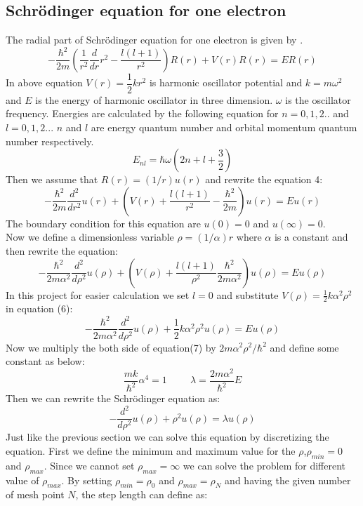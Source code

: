 \documentclass{article}
\newcommand{\hbarm}{-\frac{\hbar^{2}}{2m}}
\newcommand{\ortwo}{\frac{1}{r^{2}}}
\newcommand{\ddr}{\frac{d}{dr}}
\newcommand{\ddrsq}{\frac{d^{2}}{dr^{2}}}
\newcommand{\ddrhosq}{\frac{d^{2}}{d\rho^{2}}}
\newcommand{\onehalf}{\frac{1}{2}}
\begin{document}
\subsection{Schrödinger equation for one electron}
The radial part of Schrödinger equation for one electron is given by . 
\begin{equation}
	\hbarm	(\ortwo \ddr r^{2} - \frac{l(l+1)}{r^{2}}) R(r) + V(r)R(r) = E R(r)
\end{equation}
In above equation $V(r) = \dfrac{1}{2}kr^2$ is harmonic oscillator potential and $k = m\omega^{2}$ and $E$ is the energy of harmonic oscillator in three dimension. $\omega$ is the oscillator frequency. Energies are calculated by the following equation for $n = 0,1,2..$ and $l = 0,1,2..$. $n$ and $l$ are energy quantum number and orbital momentum quantum number respectively. 
$$E_{nl} = \hbar \omega (2n+l+\frac{3}{2})$$
Then we assume that $R(r) = (1/r)u(r)$ and rewrite the equation 4:
\begin{equation}
	\hbarm \ddrsq u(r) + (V(r) + \frac{l(l+1)}{r^{2}}\hbarm)u(r) = Eu(r)
\end{equation}
The boundary condition for this equation are $u(0) = 0$ and $u(\infty) = 0$.\\
Now we define a dimensionless variable $\rho = (1/\alpha)r$ where $\alpha$ is a constant and then rewrite the equation:
\begin{equation}
	-\frac{\hbar^{2}}{2m\alpha^{2}} \ddrhosq u(\rho) + (V(\rho) + \frac{l(l+1)}{\rho^{2}}\frac{\hbar^{2}}{2m\alpha^{2}})u(\rho) = E u(\rho)
\end{equation}
In this project for easier calculation we set $l = 0$ and substitute $V(\rho) = \onehalf k\alpha^{2}\rho^{2}$ in equation (6):
\begin{equation}
	-\frac{\hbar^{2}}{2m\alpha^{2}} \ddrhosq u(\rho) + \onehalf k\alpha^{2} \rho^{2}u(\rho) = E u(\rho)
\end{equation}
Now we multiply the both side of equation(7) by $2m\alpha^{2} \rho^{2} /\hbar^{2}$ and define some constant as below:
$$\frac{mk}{\hbar^{2}}\alpha^{4} = 1 \hspace{1cm}\lambda = \frac{2m\alpha^{2}}{\hbar^{2}}E$$
Then we can rewrite the Schrödinger equation as:
\begin{equation}
	-\ddrhosq u(\rho) + \rho^{2} u(\rho) = \lambda u({\rho})
\end{equation}
Just like the previous section we can solve this equation by discretizing the equation. First we define the minimum and maximum value for the $\rho$,$\rho_{min} = 0$ and $\rho_{max}$. Since we cannot set $\rho_{max} = \infty$ we can solve the problem for different value of $\rho_{max}$. By setting $\rho_{min} =\rho_0$ and $\rho_{max} = \rho_N$ and having the given number of mesh point $N$, the step length can define as:
\end{document}
